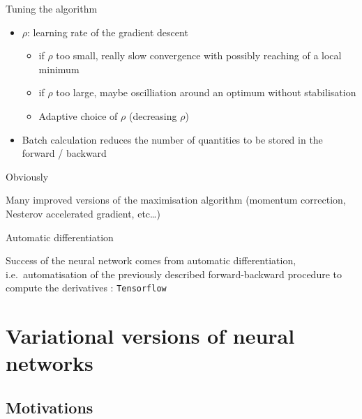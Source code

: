 \documentclass[compress,10pt]{beamer}
\begin{document}
\begin{frame}{Tuning the algorithm}
 

\begin{itemize}
 
\item
  \(\rho\): learning rate of the gradient descent

  \begin{itemize}
  
  \item
    if \(\rho\) too small, really slow convergence with possibly
    reaching of a local minimum\\
  \item
    if \(\rho\) too large, maybe oscilliation around an optimum without
    stabilisation
  \item
    Adaptive choice of \(\rho\) (decreasing $\rho$)
  \end{itemize}
\item
  Batch calculation reduces the number of quantities to be stored in the
  forward / backward
\end{itemize}

\end{frame}
\begin{frame}{Obviously}
\protect\hypertarget{obviously}{}

Many improved versions of the maximisation algorithm (momentum
correction, Nesterov accelerated gradient, etc\ldots{})

\end{frame}

\begin{frame}[fragile]{Automatic differentiation}
\protect\hypertarget{automatic-differentiation}{}

Success of the neural network comes from automatic differentiation,
i.e.~automatisation of the previously described forward-backward
procedure to compute the derivatives : \texttt{Tensorflow}

\end{frame}


\section{Variational versions of neural networks}

\subsection{Motivations}
\end{document}
